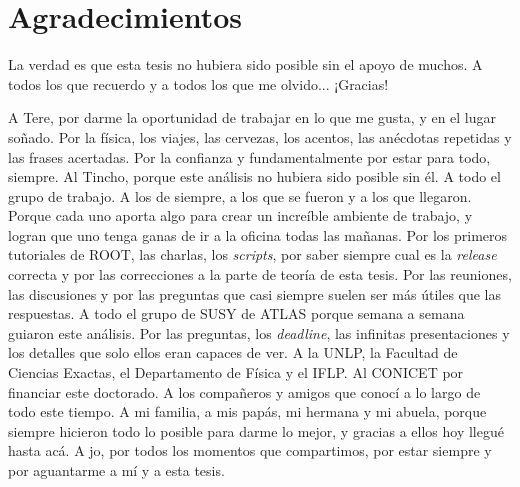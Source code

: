 \chapter*{Agradecimientos}

La verdad es que esta tesis no hubiera sido posible sin el
apoyo de muchos. A todos los que recuerdo y a todos
los que me olvido... ¡Gracias!

A Tere, por darme la oportunidad de trabajar en lo que me gusta, y en
el lugar so\~nado. Por la física, los viajes, las cervezas, los acentos,
las anécdotas repetidas y las frases acertadas. Por la confianza y
fundamentalmente por estar para todo, siempre.
Al Tincho, porque este análisis no hubiera sido posible sin él.
A todo el grupo de trabajo. A los de siempre, a los que se fueron y a los que
llegaron. Porque cada uno aporta algo para crear un increíble ambiente
de trabajo, y logran que uno tenga ganas de ir a la oficina todas las ma\~nanas. Por los
primeros tutoriales de ROOT, las charlas, los \emph{scripts}, por saber siempre cual
es la \emph{release} correcta y por las correcciones a la parte de teoría de esta tesis.
Por las reuniones, las discusiones y por las preguntas que casi siempre suelen ser más útiles
que las respuestas.
A todo el grupo de SUSY de ATLAS porque semana a semana guiaron este análisis.
Por las preguntas, los \emph{deadline}, las infinitas presentaciones y los detalles que solo ellos
eran capaces de ver.
A la UNLP, la Facultad de Ciencias Exactas, el Departamento de Física y el IFLP. Al CONICET por financiar
este doctorado.
A los compañeros y amigos que conocí a lo largo de todo este tiempo.
A mi familia, a mis papás, mi hermana y mi abuela, porque siempre hicieron todo lo posible
para darme lo mejor, y gracias a ellos hoy llegué hasta acá.
A jo, por todos los momentos que compartimos, por estar siempre y por aguantarme a mí y a esta tesis.
